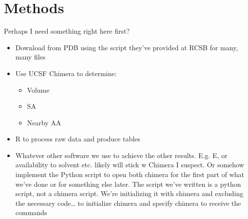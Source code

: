 \chapter{Methods}
	Perhaps I need something right here first?
	\begin{itemize}
		\item Download from PDB using the script they’ve provided at RCSB for many, many files
		
		\item Use UCSF Chimera to determine:
		\begin{itemize}
			\item Volume
			\item SA
			\item Nearby AA
		\end{itemize}
		
		\item R to process raw data and produce tables
		\item Whatever other software we use to achieve the other results. E.g. E, or availability to solvent etc. likely will stick w Chimera I suspect. Or somehow implement the Python script to open both chimera for the first part of what we’ve done or for something else later. The script we’ve written is a python script, not a chimera script. We’re initializing it with chimera and excluding the necessary code… to initialize chimera and specify chimera to receive the commands
		
	\end{itemize}
